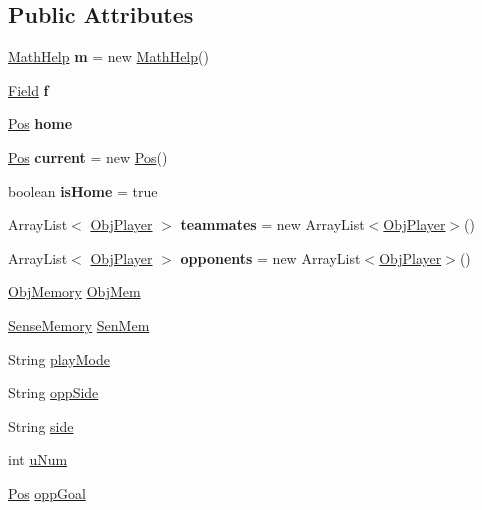 \subsection*{Public Attributes}
\begin{DoxyCompactItemize}
\item 
\hypertarget{classMemory_afb5e10d7716ba7cb3c3e0a3a4b336a8f}{
\hyperlink{classMathHelp}{MathHelp} {\bfseries m} = new \hyperlink{classMathHelp}{MathHelp}()}
\label{classMemory_afb5e10d7716ba7cb3c3e0a3a4b336a8f}

\item 
\hypertarget{classMemory_ab55dd7b896a2c05e64109215ecb67b45}{
\hyperlink{classField}{Field} {\bfseries f}}
\label{classMemory_ab55dd7b896a2c05e64109215ecb67b45}

\item 
\hypertarget{classMemory_a600689cf6d1edd272c50b71b413bf0b6}{
\hyperlink{classPos}{Pos} {\bfseries home}}
\label{classMemory_a600689cf6d1edd272c50b71b413bf0b6}

\item 
\hypertarget{classMemory_a6bb98a089f2b73c6e35c73d37fcaa91b}{
\hyperlink{classPos}{Pos} {\bfseries current} = new \hyperlink{classPos}{Pos}()}
\label{classMemory_a6bb98a089f2b73c6e35c73d37fcaa91b}

\item 
\hypertarget{classMemory_a3851e9c9410407dec042905dfb3a097e}{
boolean {\bfseries isHome} = true}
\label{classMemory_a3851e9c9410407dec042905dfb3a097e}

\item 
\hypertarget{classMemory_a775861ea1cd61b8d77f5c2c9212d7088}{
ArrayList$<$ \hyperlink{classObjPlayer}{ObjPlayer} $>$ {\bfseries teammates} = new ArrayList$<$\hyperlink{classObjPlayer}{ObjPlayer}$>$()}
\label{classMemory_a775861ea1cd61b8d77f5c2c9212d7088}

\item 
\hypertarget{classMemory_a2f4179e0c17d45dbae6340c753d3d811}{
ArrayList$<$ \hyperlink{classObjPlayer}{ObjPlayer} $>$ {\bfseries opponents} = new ArrayList$<$\hyperlink{classObjPlayer}{ObjPlayer}$>$()}
\label{classMemory_a2f4179e0c17d45dbae6340c753d3d811}

\item 
\hyperlink{classObjMemory}{ObjMemory} \hyperlink{classMemory_a0275565eade385f502f6c132f861f11f}{ObjMem}
\item 
\hyperlink{classSenseMemory}{SenseMemory} \hyperlink{classMemory_a5a5e28abf688e0a18930e5dbdbc807b2}{SenMem}
\item 
String \hyperlink{classMemory_a96f2cc811ed87dfd6056fccd9c10ca40}{playMode}
\item 
String \hyperlink{classMemory_a966a412595e961d93cf7404efda0db9c}{oppSide}
\item 
String \hyperlink{classMemory_ac56cee169ca4e880744065f25f306b82}{side}
\item 
int \hyperlink{classMemory_a62572ea10a84193a66c33ecd43c252f7}{uNum}
\item 
\hyperlink{classPos}{Pos} \hyperlink{classMemory_afb4aa82077de0c1642e4d3dbf0619615}{oppGoal}
\end{DoxyCompactItemize}

